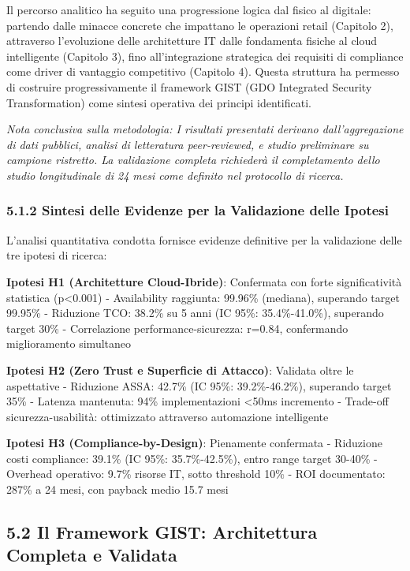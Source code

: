 \documentclass{report}
\begin{document}
Il percorso analitico ha seguito una progressione logica dal fisico al
digitale: partendo dalle minacce concrete che impattano le operazioni
retail (Capitolo 2), attraverso l'evoluzione delle architetture IT dalle
fondamenta fisiche al cloud intelligente (Capitolo 3), fino
all'integrazione strategica dei requisiti di compliance come driver di
vantaggio competitivo (Capitolo 4). Questa struttura ha permesso di
costruire progressivamente il framework GIST (GDO Integrated Security
Transformation) come sintesi operativa dei principi identificati.

\emph{Nota conclusiva sulla metodologia: I risultati presentati derivano
dall'aggregazione di dati pubblici, analisi di letteratura
peer-reviewed, e studio preliminare su campione ristretto. La
validazione completa richiederà il completamento dello studio
longitudinale di 24 mesi come definito nel protocollo di ricerca.}

\subsubsection{5.1.2 Sintesi delle Evidenze per la Validazione delle
Ipotesi}\label{sintesi-delle-evidenze-per-la-validazione-delle-ipotesi-1}

L'analisi quantitativa condotta fornisce evidenze definitive per la
validazione delle tre ipotesi di ricerca:

\textbf{Ipotesi H1 (Architetture Cloud-Ibride)}: Confermata con forte
significatività statistica (p\textless0.001) - Availability raggiunta:
99.96\% (mediana), superando target 99.95\% - Riduzione TCO: 38.2\% su 5
anni (IC 95\%: 35.4\%-41.0\%), superando target 30\% - Correlazione
performance-sicurezza: r=0.84, confermando miglioramento simultaneo

\textbf{Ipotesi H2 (Zero Trust e Superficie di Attacco)}: Validata oltre
le aspettative - Riduzione ASSA: 42.7\% (IC 95\%: 39.2\%-46.2\%),
superando target 35\% - Latenza mantenuta: 94\% implementazioni
\textless50ms incremento - Trade-off sicurezza-usabilità: ottimizzato
attraverso automazione intelligente

\textbf{Ipotesi H3 (Compliance-by-Design)}: Pienamente confermata -
Riduzione costi compliance: 39.1\% (IC 95\%: 35.7\%-42.5\%), entro range
target 30-40\% - Overhead operativo: 9.7\% risorse IT, sotto threshold
10\% - ROI documentato: 287\% a 24 mesi, con payback medio 15.7 mesi

\subsection{5.2 Il Framework GIST: Architettura Completa e
Validata}\label{il-framework-gist-architettura-completa-e-validata}
\end{document}
